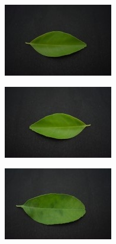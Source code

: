 \documentclass[twocolumn]{article}
\begin{document}
\begin{figure}[H]
    \begin{subfigure}[b]{0.30\columnwidth}
        \includegraphics[width=\textwidth]{lemon4}
    \end{subfigure}
    \hfill
    \begin{subfigure}[b]{0.30\columnwidth}
        \includegraphics[width=\textwidth]{lemon5}
    \end{subfigure}
    \hfill
    \begin{subfigure}[b]{0.30\columnwidth}
        \includegraphics[width=\textwidth]{lemon6}
    \end{subfigure}
    \vspace{0.5em}
    

\end{figure}
\end{document}
